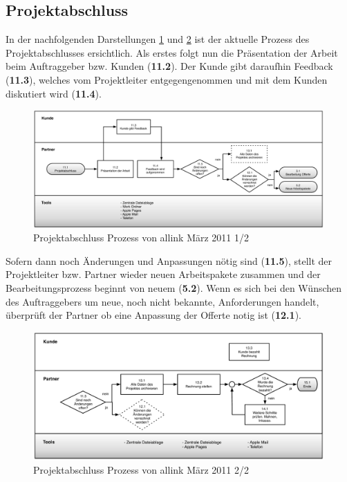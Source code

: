 \subsection{Projektabschluss}
In der nachfolgenden Darstellungen \ref{pic:03_ist_prozesse_abschluss_01} und
\ref{pic:03_ist_prozesse_abschluss_02} ist der aktuelle Prozess des Projektabschlusses 
ersichtlich. Als erstes folgt nun die Präsentation der Arbeit beim Auftraggeber 
bzw. Kunden (\textbf{11.2}). Der Kunde gibt daraufhin Feedback (\textbf{11.3}), 
welches vom Projektleiter entgegengenommen und mit dem Kunden diskutiert wird (\textbf{11.4}).

\begin{figure}[htbp]
\begin{center}
\includegraphics[width=0.99\textwidth,angle=0]{./bilder/analyse/03_ist_prozesse_abschluss_01.pdf}
\caption{Projektabschluss Prozess von allink März 2011 1/2}
\label{pic:03_ist_prozesse_abschluss_01}
\end{center}
\end{figure}

Sofern dann noch Änderungen und Anpassungen nötig sind (\textbf{11.5}), stellt
der Projektleiter bzw. Partner wieder neuen Arbeitspakete zusammen und der
Bearbeitungsprozess beginnt von neuem (\textbf{5.2}). Wenn es sich bei den Wünschen
des Auftraggebers um neue, noch nicht bekannte, Anforderungen handelt, überprüft
der Partner ob eine Anpassung der Offerte notig ist (\textbf{12.1}).

\begin{figure}[htbp]
\begin{center}
\includegraphics[width=0.99\textwidth,angle=0]{./bilder/analyse/03_ist_prozesse_abschluss_02.pdf}
\caption{Projektabschluss Prozess von allink März 2011 2/2}
\label{pic:03_ist_prozesse_abschluss_02}
\end{center}
\end{figure}

